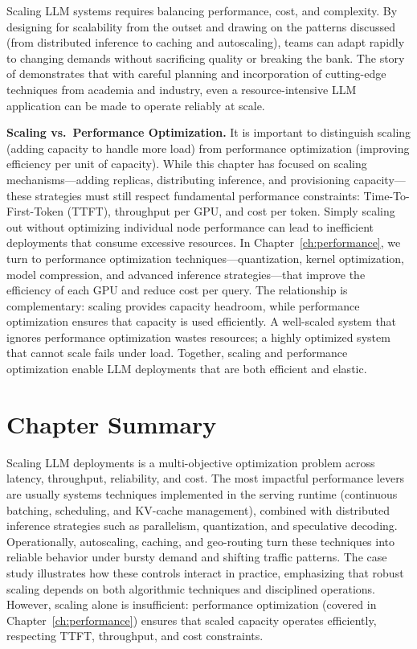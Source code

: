 Scaling LLM systems requires balancing performance, cost, and complexity. By designing for scalability from the outset and drawing on the patterns discussed (from distributed inference to caching and autoscaling), teams can adapt rapidly to changing demands without sacrificing quality or breaking the bank. The story of \ishtar{} demonstrates that with careful planning and incorporation of cutting-edge techniques from academia and industry, even a resource-intensive LLM application can be made to operate reliably at scale. 

\medskip
\noindent\textbf{Scaling vs.\ Performance Optimization.} It is important to distinguish scaling (adding capacity to handle more load) from performance optimization (improving efficiency per unit of capacity). While this chapter has focused on scaling mechanisms---adding replicas, distributing inference, and provisioning capacity---these strategies must still respect fundamental performance constraints: Time-To-First-Token (TTFT), throughput per GPU, and cost per token. Simply scaling out without optimizing individual node performance can lead to inefficient deployments that consume excessive resources. In Chapter~\ref{ch:performance}, we turn to performance optimization techniques---quantization, kernel optimization, model compression, and advanced inference strategies---that improve the efficiency of each GPU and reduce cost per query. The relationship is complementary: scaling provides capacity headroom, while performance optimization ensures that capacity is used efficiently. A well-scaled system that ignores performance optimization wastes resources; a highly optimized system that cannot scale fails under load. Together, scaling and performance optimization enable LLM deployments that are both efficient and elastic.

\section*{Chapter Summary}
Scaling LLM deployments is a multi-objective optimization problem across latency, throughput, reliability, and cost. The most impactful performance levers are usually systems techniques implemented in the serving runtime (continuous batching, scheduling, and KV-cache management), combined with distributed inference strategies such as parallelism, quantization, and speculative decoding. Operationally, autoscaling, caching, and geo-routing turn these techniques into reliable behavior under bursty demand and shifting traffic patterns. The \ishtar{} case study illustrates how these controls interact in practice, emphasizing that robust scaling depends on both algorithmic techniques and disciplined operations. However, scaling alone is insufficient: performance optimization (covered in Chapter~\ref{ch:performance}) ensures that scaled capacity operates efficiently, respecting TTFT, throughput, and cost constraints.

\printbibliography[
  heading=subbibliography,
  segment=\therefsegment,
  resetnumbers=true
]